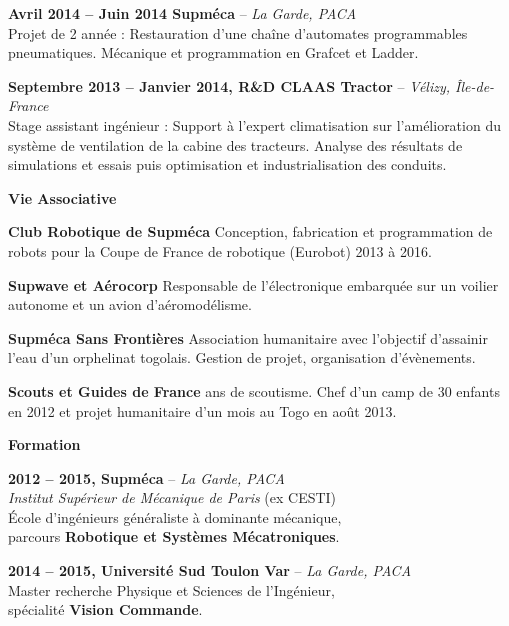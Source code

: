 \documentclass[a4paper,11pt,final]{memoir}
\newcommand{\Sep}{\vspace{1.3em}}
\newcommand{\SmallSep}{\vspace{0.5em}}
\newcommand{\CVSection}[1]
	{\Large\textbf{#1}\par
	\SmallSep\normalsize\normalfont}
\newcommand{\CVItem}[2]
	{\textbf{\color{RoyalBlue} #1 \color{dark_gray} #2}\normalsize\normalfont}
\newcommand{\city}[1]
	{{\small\color{dark_gray}\emph{#1}}\normalsize\normalfont}
\begin{document}
\CVItem{Avril 2014 -- Juin 2014}{Supméca} -- \city{La Garde, PACA}\\
Projet de 2\ieme{} année : Restauration d'une chaîne d'automates programmables pneumatiques. Mécanique et programmation en Grafcet et Ladder.
\SmallSep

\CVItem{Septembre 2013 -- Janvier 2014,}{R\&D CLAAS Tractor} -- \city{Vélizy, Île-de-France}\\
Stage assistant ingénieur : Support à l'expert climatisation sur l'amélioration du système de ventilation de la cabine des tracteurs. Analyse des résultats de simulations et essais puis optimisation et industrialisation des conduits.
\SmallSep

%
\Sep

\CVSection{Vie Associative}
\CVItem{Club Robotique de Supméca}{}Conception, fabrication et programmation de robots pour la Coupe de France de robotique (Eurobot) 2013 à 2016.
\SmallSep

\CVItem{Supwave et Aérocorp}{}Responsable de l'électronique embarquée sur un voilier autonome et un avion d'aéromodélisme.
\SmallSep

\CVItem{Supméca Sans Frontières}{}Association humanitaire avec l'objectif d'assainir l'eau d'un orphelinat togolais. Gestion de projet, organisation d'évènements.
\SmallSep

\CVItem{Scouts et Guides de France}{}8 ans de scoutisme. Chef d'un camp de 30 enfants en 2012 et projet humanitaire d'un mois au Togo en août 2013.
\Sep

\CVSection{Formation}

\CVItem{2012 -- 2015,}{Supméca} -- \city{La Garde, PACA}\\
\emph{Institut Supérieur de Mécanique de Paris} (ex CESTI)\\
École d'ingénieurs généraliste à dominante mécanique, \\parcours \textbf{Robotique et Systèmes Mécatroniques}.
\SmallSep

\CVItem{2014 -- 2015,}{Université Sud Toulon Var} -- \city{La Garde, PACA}\\
Master recherche Physique et Sciences de l'Ingénieur,\\ spécialité \textbf{Vision Commande}.
\SmallSep
\end{document}
